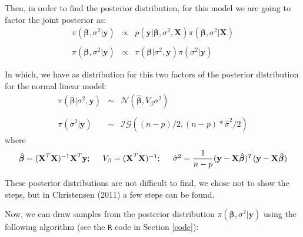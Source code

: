 \documentclass[a4paper, 11pt]{article}
\begin{document}
Then, in order to find the posterior distribution, for this model we are going to factor the joint posterior as:
\begin{equation*}
\begin{array}{lclll}
\pi(\boldsymbol{\beta},\sigma^2|\textbf{y}) & \propto & p(\textbf{y}|\boldsymbol{\beta},\sigma^2,\textbf{X}) \pi(\boldsymbol{\beta},\sigma^2|\textbf{X}) \\\\

\pi(\boldsymbol{\beta},\sigma^2|\textbf{y}) & \propto & \pi(\boldsymbol{\beta}|\sigma^2,\textbf{y})\pi(\sigma^2|\textbf{y})
\end{array}
\end{equation*}

In which, we have as distribution for this two factors of the posterior distribution for the normal linear model:
\begin{equation}\label{eq1}
\begin{array}{lclll}
\pi(\boldsymbol{\beta}|\sigma^2,\textbf{y}) & \sim & \mathcal{N}(\boldsymbol{\hat{\beta}}, V_\beta \sigma^2) \\\\

\pi(\sigma^2|\textbf{y}) & \sim &  \mathcal{IG}((n-p)/2, (n-p)*\hat{\sigma}^2/2) 
\end{array}
\end{equation}
\noindent
where
\begin{equation}\label{eq2}
\begin{array}{lclll}
\boldsymbol{\hat{\beta}}  =  (\textbf{X}^T\textbf{X})^{-1}\textbf{X}^T\textbf{y}; \hspace{0.5cm} 
V_\beta  =  (\textbf{X}^T\textbf{X})^{-1}; \hspace{0.5cm} \hat{\sigma}^2  =  \dfrac{1}{n-p} (\textbf{y} -  \textbf{X}\boldsymbol{\hat{\beta}})^T(\textbf{y} -  \textbf{X}\boldsymbol{\hat{\beta}})
\end{array}
\end{equation}

These posterior distributions are not difficult to find, we chose not to show the steps, but in Christensen (2011) a few steps can be found.

Now, we can draw samples from the posterior distribution $\pi(\boldsymbol{\beta},\sigma^2|\textbf{y})$ using the following algorithm (see the \texttt{R} code in Section \ref{code}):
\end{document}
